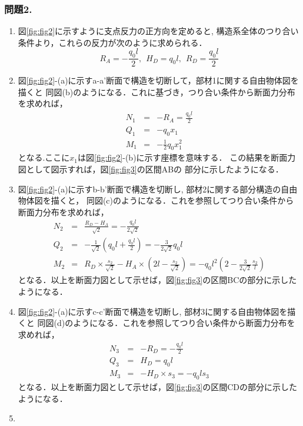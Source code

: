 ﻿\documentclass[10pt,a4j]{jarticle}
\begin{document}
\subsubsection*{問題2.}
\begin{enumerate}
\item
図\ref{fig:fig2}に示すように支点反力の正方向を定めると,
構造系全体のつり合い条件より，これらの反力が次のように求められる．
\begin{equation}
	R_A=-\frac{q_0l}{2}, \ \ 
	H_D=q_0l, \ \ 
	R_D=\frac{q_0l}{2}
\end{equation}
\item
図\ref{fig:fig2}-(a)に示すa-a'断面で構造を切断して，部材1に関する自由物体図を描くと
同図(b)のようになる．これに基づき，つり合い条件から断面力分布を求めれば，
\begin{eqnarray}
	N_1 &=&-R_A=\frac{q_0l}{2} \\
	Q_1 &=& -q_0x_1 \\ 
	M_1 &=&-\frac{1}{2} q_0x_1^2 
\end{eqnarray}
となる.ここに$x_1$は図\ref{fig:fig2}-(b)に示す座標を意味する．
この結果を断面力図として図示すれば，図\ref{fig:fig3}の区間ABの
部分に示したようになる．
\item
図\ref{fig:fig2}-(a)に示すb-b'断面で構造を切断し, 部材2に関する部分構造の自由物体図を描くと，
同図(c)のようになる．これを参照してつり合い条件から断面力分布を求めれば，
\begin{eqnarray}
	N_2 &=& \frac{R_D-H_A}{\sqrt{2}}=-\frac{q_0l}{2\sqrt{2}} \\
	Q_2 &=&-\frac{1}{\sqrt{2}}\left(q_0l+\frac{q_0l}{2}\right) = -\frac{3}{2\sqrt{2}}q_0l \\
	M_2 &=& R_D\times \frac{s_2}{\sqrt{2}} -H_A\times \left(2l-\frac{s_2}{\sqrt{2}}\right)
	=
	-q_0l^2 \left( 2-\frac{3}{2\sqrt{2}}\frac{s_2}{l}\right)
\end{eqnarray}
となる．以上を断面力図として示せば，図\ref{fig:fig3}の区間BCの部分に示したようになる．
\item
図\ref{fig:fig2}-(a)に示すc-c'断面で構造を切断し, 部材3に関する自由物体図を描くと
同図(d)のようになる．これを参照してつり合い条件から断面力分布を求めれば，
\begin{eqnarray}
	N_3 &=&-R_D= -\frac{q_0l}{2} \\
	Q_3 &=& H_D=q_0l \\
	M_3 &=& -H_D\times s_3=-q_0ls_3
\end{eqnarray}
となる．以上を断面力図として示せば，図\ref{fig:fig3}の区間CDの部分に示したようになる．
\item

\end{enumerate}
\end{document}
